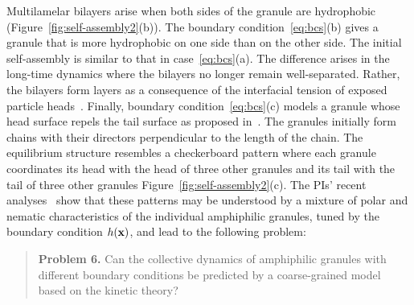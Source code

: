 Multilamelar bilayers arise when both sides of the granule are
hydrophobic (Figure~\ref{fig:self-assembly2}(b)). The boundary
condition~\eqref{eq:bcs}(b) gives a granule that is more hydrophobic on
one side than on the other side. The initial self-assembly is similar to
that in case~\eqref{eq:bcs}(a). The difference arises in the long-time
dynamics where the bilayers no longer remain well-separated. Rather, the
bilayers form layers as a consequence of the interfacial tension of
exposed particle heads~\cite{Huetal19, deMeetal21}. 
%
Finally, boundary condition~\eqref{eq:bcs}(c) models a granule whose
head surface repels the tail surface as proposed in~\cite{MaRa76, Ma77}.
The granules initially form chains with their directors perpendicular to
the length of the chain. The equilibrium structure resembles a
checkerboard pattern where each granule coordinates its head with the
head of three other granules and its tail with the tail of three other
granules Figure~\ref{fig:self-assembly2}(c).
%
The PIs' recent analyses~\cite{fu-ryh-qua-you2022} show that these
patterns may be understood by a mixture of polar and nematic
characteristics of the individual amphiphilic granules, tuned by the
boundary condition $h({\mathbf{x}})$, and lead to the following problem:
%
\begin{quotation}
  \noindent
  \textbf{Problem 6.} Can the collective dynamics of amphiphilic granules with different boundary conditions 
be predicted by a coarse-grained model based on the kinetic theory?
\end{quotation}
%
